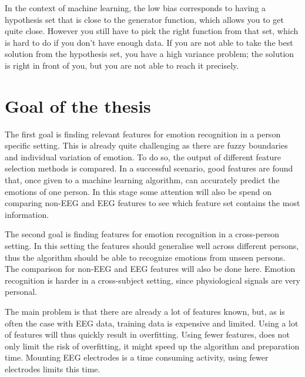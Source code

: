 \npar

In the context of machine learning, the low bias corresponds to having a hypothesis set that is close to the generator function, which allows you to get quite close. However you still have to pick the right function from that set, which is hard to do if you don't have enough data. If you are not able to take the best solution from the hypothesis set, you have a high variance problem; the solution is right in front of you, but you are not able to reach it precisely.


\section{Goal of the thesis}
The first goal is finding relevant features for emotion recognition in a person specific setting. This is already quite challenging as there are fuzzy boundaries and individual variation of emotion\citep{emorecoghard}. To do so, the output of different feature selection methods is compared. In a successful scenario, good features are found that, once given to a machine learning algorithm, can accurately predict the emotions of one person. In this stage some attention will also be spend on comparing non-EEG and EEG features to see which feature set contains the most information.

\npar

The second goal is finding features for emotion recognition in a cross-person setting. In this setting the features should generalise well across different persons, thus the algorithm should be able to recognize emotions from unseen persons. The comparison for non-EEG and EEG features will also be done here. Emotion recognition is harder in a cross-subject setting, since physiological signals are very personal\citep{DEAP}.

\npar

The main problem is that there are already a lot of features known, but, as is often the case with EEG data, training data is expensive and limited. Using a lot of features will thus quickly result in overfitting. Using fewer features, does not only limit the risk of overfitting, it might speed up the algorithm and preparation time. Mounting EEG electrodes is a time consuming activity, using fewer electrodes limits this time.

